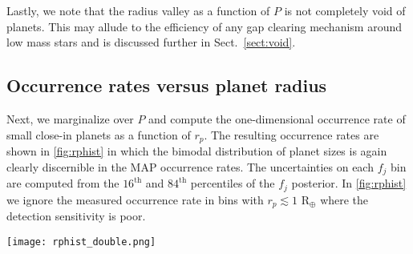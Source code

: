 \documentclass[twocolumn]{emulateapj}
\newcommand{\kepler}[1]{\emph{Kepler}#1}
\newcommand{\ktwo}[1]{\emph{K2}#1}
\begin{document}
Lastly, we note that the radius valley as a function of $P$ is not completely void of planets.
This may allude to the efficiency of any gap clearing mechanism around low mass stars and is
discussed further in Sect.~\ref{sect:void}.

\vspace{1cm}

\subsection{Occurrence rates versus planet radius}
Next, we marginalize over $P$ and compute the one-dimensional occurrence rate of small close-in planets
as a function of $r_p$. The resulting occurrence rates are shown in \autoref{fig:rphist} in which the bimodal
distribution of planet sizes is again clearly discernible in the MAP occurrence rates.
The uncertainties on each $f_j$ bin are computed from the $16^{\text{th}}$ and $84^{\text{th}}$ percentiles
of the $f_j$ posterior. In \autoref{fig:rphist} we ignore the measured occurrence rate in bins with
$r_p\lesssim 1$ R$_{\oplus}$ where the detection sensitivity is poor.

  
\begin{figure*}
  \centering
  \texttt{[image: rphist\_double.png]}
  \caption{Occurrence rate of planets as a function of size. \emph{Upper panel}:
    histogram depicting the relative occurrence
    rate of close-in planets with orbital periods $<100$ days derived from the population of confirmed
    \kepler{} and \ktwo{} planets around low mass stars. The bimodal distribution of planet radii peaking
    at occurrence rate-weighted radii of 1.12 and 2.07 R$_{\oplus}$ indicates the presence of the radius valley
    around low mass stars centered at 1.54 R$_{\oplus}$. Uncertainties in the planet occurrences follow from binomial
    statistics and are limited by
    the relatively small number of confirmed planets around low mass stars from \kepler{} and \ktwo{.} 
    The measured occurrence rates below $\sim 1$ R$_{\oplus}$ (shown in \emph{grey}) should be ignored due to
    poor detection sensitivity. \emph{Lower panel}: identical occurrence rates as in the upper panel 
    accompanied by the same occurrence rates but with finer radius bins.
    The corresponding occurrence rate uncertainties per bin are inflated but the bimodal structure continues
    to be exhibited in the MAP occurrence rates. The shaded regions highlight our approximate
    definitions of rocky planets ($r_p \in [0.97,1.54]$ R$_{\oplus}$), down to reasonable sensitivity limits,
    and non-rocky planets ($r_p > 1.54$ R$_{\oplus}$) around low mass stars. Note the 2.5 R$_{\oplus}$ outer limit of
    the shaded region is chosen arbitrarily.}
  \label{fig:rphist}
\end{figure*}
\end{document}
